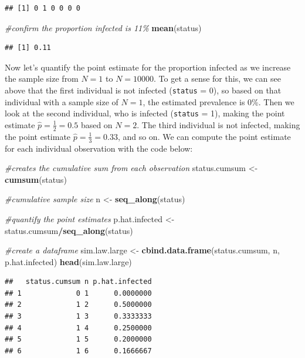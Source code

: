 \documentclass[
]{book}
\newenvironment{Shaded}{\begin{snugshade}}{\end{snugshade}}
\newcommand{\CommentTok}[1]{\textcolor[rgb]{0.56,0.35,0.01}{\textit{#1}}}
\newcommand{\FunctionTok}[1]{\textcolor[rgb]{0.13,0.29,0.53}{\textbf{#1}}}
\newcommand{\NormalTok}[1]{#1}
\newcommand{\OtherTok}[1]{\textcolor[rgb]{0.56,0.35,0.01}{#1}}
\newcommand{\SpecialCharTok}[1]{\textcolor[rgb]{0.81,0.36,0.00}{\textbf{#1}}}
\begin{document}
\begin{verbatim}
## [1] 0 1 0 0 0 0
\end{verbatim}

\begin{Shaded}
\begin{Highlighting}[]
\CommentTok{\#confirm the proportion infected is 11\% }
\FunctionTok{mean}\NormalTok{(status)}
\end{Highlighting}
\end{Shaded}

\begin{verbatim}
## [1] 0.11
\end{verbatim}

Now let's quantify the point estimate for the proportion infected as we increase the sample size from \(N = 1\) to \(N = 10000\). To get a sense for this, we can see above that the first individual is not infected (\texttt{status} = 0), so based on that individual with a sample size of \(N = 1\), the estimated prevalence is 0\%. Then we look at the second individual, who is infected (\texttt{status} = 1), making the point estimate \(\hat{p}=\frac{1}{2}=0.5\) based on \(N = 2\). The third individual is not infected, making the point estimate \(\hat{p}=\frac{1}{3}=0.33\), and so on. We can compute the point estimate for each individual observation with the code below:

\begin{Shaded}
\begin{Highlighting}[]
\CommentTok{\#creates the cumulative sum from each observation}
\NormalTok{status.cumsum }\OtherTok{\textless{}{-}} \FunctionTok{cumsum}\NormalTok{(status)}

\CommentTok{\#cumulative sample size }
\NormalTok{n }\OtherTok{\textless{}{-}} \FunctionTok{seq\_along}\NormalTok{(status)}

\CommentTok{\#quantify the point estimates}
\NormalTok{p.hat.infected }\OtherTok{\textless{}{-}}\NormalTok{ status.cumsum}\SpecialCharTok{/}\FunctionTok{seq\_along}\NormalTok{(status)}

\CommentTok{\#create a dataframe}
\NormalTok{sim.law.large }\OtherTok{\textless{}{-}} \FunctionTok{cbind.data.frame}\NormalTok{(status.cumsum, n, p.hat.infected)}
\FunctionTok{head}\NormalTok{(sim.law.large)}
\end{Highlighting}
\end{Shaded}

\begin{verbatim}
##   status.cumsum n p.hat.infected
## 1             0 1      0.0000000
## 2             1 2      0.5000000
## 3             1 3      0.3333333
## 4             1 4      0.2500000
## 5             1 5      0.2000000
## 6             1 6      0.1666667
\end{verbatim}
\end{document}
